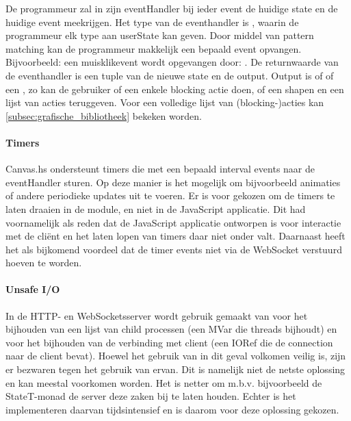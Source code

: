 De programmeur zal in zijn eventHandler bij ieder event de huidige state en de huidige event meekrijgen. Het type van de eventhandler is , waarin de programmeur elk type aan userState kan geven. Door middel van pattern matching kan de programmeur makkelijk een bepaald event opvangen. Bijvoorbeeld: een muisklikevent wordt opgevangen door: . De returnwaarde van de eventhandler is een tuple van de nieuwe state en de output. Output is of  of een , zo kan de gebruiker of een enkele blocking actie doen, of een shapen en een lijst van acties teruggeven. Voor een volledige lijst van (blocking-)acties kan \autoref{subsec:grafische_bibliotheek} bekeken worden.

\paragraph{Timers}
Canvas.hs ondersteunt timers die met een bepaald interval events naar de eventHandler sturen. Op deze manier is het mogelijk om bijvoorbeeld animaties of andere periodieke updates uit te voeren. Er is voor gekozen om de timers te laten draaien in de module, en niet in de JavaScript applicatie. Dit had voornamelijk als reden dat de JavaScript applicatie ontworpen is voor interactie met de cliënt en het laten lopen van timers daar niet onder valt. Daarnaast heeft het als bijkomend voordeel dat de timer events niet via de WebSocket verstuurd hoeven te worden.

\paragraph{Unsafe I/O}
In de HTTP- en WebSocketsserver wordt gebruik gemaakt van  voor het bijhouden van een lijst van child processen (een MVar die threads bijhoudt) en voor het bijhouden van de verbinding met client (een IORef die de connection naar de client bevat). Hoewel het gebruik van  in dit geval volkomen veilig is, zijn er bezwaren tegen het gebruik van ervan\cite{Haskell.org2008}. Dit is namelijk niet de netste oplossing en kan meestal voorkomen worden. Het is netter om m.b.v. bijvoorbeeld de StateT-monad de server deze zaken bij te laten houden. Echter is het implementeren daarvan tijdsintensief en is daarom voor deze oplossing gekozen.
